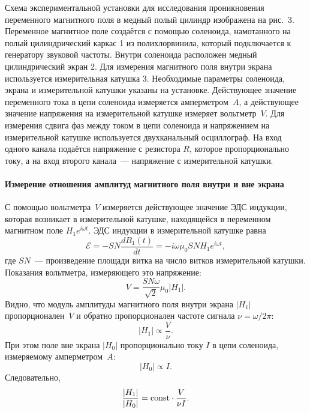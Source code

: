 



\experiment
Схема экспериментальной установки для исследования проникновения переменного магнитного поля в медный полый цилиндр
изображена на рис.~3. Переменное магнитное поле создаётся с помощью соленоида, намотанного на полый цилиндрический каркас 1
из полихлорвинила, который подключается к генератору звуковой частоты. Внутри соленоида расположен медный цилиндрический
экран 2. Для измерения магнитного поля внутри экрана используется измерительная катушка 3. Необходимые параметры
соленоида, экрана и измерительной катушки указаны на установке. Действующее значение переменного тока в цепи соленоида
измеряется амперметром~$A$, а действующее значение напряжения 
на измерительной катушке измеряет вольтметр~$V$. Для измерения сдвига фаз между током в цепи соленоида и напряжением на измерительной катушке
используется двухканальный осциллограф. На вход одного канала подаётся напряжение с резистора $R$, которое
пропорционально току, а на вход второго канала~--- напряжение с измерительной катушки.

\paragraph{Измерение отношения амплитуд магнитного поля внутри и вне экрана}

С помощью вольтметра~$V$ измеряется действующее значение ЭДС индукции, 
которая возникает в измерительной катушке, находящейся в переменном магнитном поле
$H_1e^{i\omega t}$.
ЭДС индукции в измерительной катушке равна
\[
\mathcal{E}=-SN\frac{dB_{1}(t)}{dt}=-i\omega \mu_0 S N H_1 e^{i\omega t},
\]
где $SN$~--- произведение площади витка на число витков измерительной катушки. 
Показания вольтметра, измеряющего это напряжение: 
\[
V= \frac{SN\omega}{\sqrt{2}}\mu_0|H_1|.
\]
Видно, что модуль амплитуды магнитного поля внутри экрана $|H_1|$ пропорционален~$V$ 
и обратно пропорционален частоте сигнала $\nu = \omega / 2\pi$:
\[
|H_1|\propto \frac{V}{\nu}.
\]
При этом поле вне экрана $|H_0|$ пропорционально току $I$ в цепи соленоида,
измеряемому амперметром~$A$:
\[
|H_0| \propto I.
\] 
Следовательно, 
\begin{equation} \eqmark{H1H0exp}
\frac{|H_1|}{|H_0|} = \const \cdot \frac{V}{\nu I}.
\end{equation}

